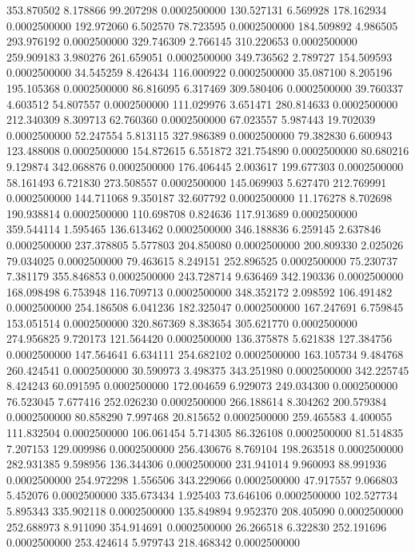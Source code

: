 353.870502 8.178866 99.207298 0.0002500000
130.527131 6.569928 178.162934 0.0002500000
192.972060 6.502570 78.723595 0.0002500000
184.509892 4.986505 293.976192 0.0002500000
329.746309 2.766145 310.220653 0.0002500000
259.909183 3.980276 261.659051 0.0002500000
349.736562 2.789727 154.509593 0.0002500000
34.545259 8.426434 116.000922 0.0002500000
35.087100 8.205196 195.105368 0.0002500000
86.816095 6.317469 309.580406 0.0002500000
39.760337 4.603512 54.807557 0.0002500000
111.029976 3.651471 280.814633 0.0002500000
212.340309 8.309713 62.760360 0.0002500000
67.023557 5.987443 19.702039 0.0002500000
52.247554 5.813115 327.986389 0.0002500000
79.382830 6.600943 123.488008 0.0002500000
154.872615 6.551872 321.754890 0.0002500000
80.680216 9.129874 342.068876 0.0002500000
176.406445 2.003617 199.677303 0.0002500000
58.161493 6.721830 273.508557 0.0002500000
145.069903 5.627470 212.769991 0.0002500000
144.711068 9.350187 32.607792 0.0002500000
11.176278 8.702698 190.938814 0.0002500000
110.698708 0.824636 117.913689 0.0002500000
359.544114 1.595465 136.613462 0.0002500000
346.188836 6.259145 2.637846 0.0002500000
237.378805 5.577803 204.850080 0.0002500000
200.809330 2.025026 79.034025 0.0002500000
79.463615 8.249151 252.896525 0.0002500000
75.230737 7.381179 355.846853 0.0002500000
243.728714 9.636469 342.190336 0.0002500000
168.098498 6.753948 116.709713 0.0002500000
348.352172 2.098592 106.491482 0.0002500000
254.186508 6.041236 182.325047 0.0002500000
167.247691 6.759845 153.051514 0.0002500000
320.867369 8.383654 305.621770 0.0002500000
274.956825 9.720173 121.564420 0.0002500000
136.375878 5.621838 127.384756 0.0002500000
147.564641 6.634111 254.682102 0.0002500000
163.105734 9.484768 260.424541 0.0002500000
30.590973 3.498375 343.251980 0.0002500000
342.225745 8.424243 60.091595 0.0002500000
172.004659 6.929073 249.034300 0.0002500000
76.523045 7.677416 252.026230 0.0002500000
266.188614 8.304262 200.579384 0.0002500000
80.858290 7.997468 20.815652 0.0002500000
259.465583 4.400055 111.832504 0.0002500000
106.061454 5.714305 86.326108 0.0002500000
81.514835 7.207153 129.009986 0.0002500000
256.430676 8.769104 198.263518 0.0002500000
282.931385 9.598956 136.344306 0.0002500000
231.941014 9.960093 88.991936 0.0002500000
254.972298 1.556506 343.229066 0.0002500000
47.917557 9.066803 5.452076 0.0002500000
335.673434 1.925403 73.646106 0.0002500000
102.527734 5.895343 335.902118 0.0002500000
135.849894 9.952370 208.405090 0.0002500000
252.688973 8.911090 354.914691 0.0002500000
26.266518 6.322830 252.191696 0.0002500000
253.424614 5.979743 218.468342 0.0002500000
